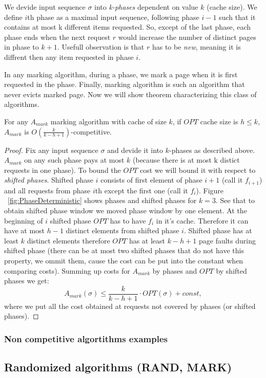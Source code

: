 We devide input sequence $\sigma$ into \textit{k-phases} dependent on value $k$ 
(cache size). We define $i$th phase as a maximal input sequence, following 
phase $i-1$ such that it contains at most k different items requested. So, 
except of the last phase, each phase ends when the next request $r$ would 
increase the number of distinct pages in phase to $k+1$. Usefull observation is 
that $r$ has to be \textit{new}, meaning it is diffrent then any item requested 
in phase $i$.


In any marking algorithm, during a phase, we mark a page when it is first 
requested in the phase. Finally, marking algorithm is such an algorithm that 
never evicts marked page. Now we will show theorem characterizing this class of 
algorithms.
\begin{theorem}
For any $A_{mark}$ marking algorithm with cache of size $k$, if $OPT$ cache 
size is $h \leq k$, $A_{mark}$ is $O(\frac{k}{k-h+1})$-competitive.
\end{theorem}
\begin{proof}
Fix any input sequence $\sigma$ and devide it into $k$-phases as described 
above. $A_{mark}$ on any such phase pays at most $k$ (because there is at most 
k distict requests in one phase). To bound the $OPT$ cost we will bound it with 
respect to \textit{shifted phases}. Shifted phase $i$ consists 
of first element of phase $i+1$ (call it $f_{i+1}$) and all requests from phase 
$i$th except the first one (call it $f_i$). Figure 
~\ref{fig:PhaseDeterministic} shows phases and shifted phases for $k=3$. See 
that to obtain shifted phase window we moved phase window by one element. At 
the beginning of $i$ shifted phase $OPT$ has to have $f_i$ in it's cache. 
Therefore it can have at most $h-1$ distinct elements from shifted phase $i$. 
Shifted phase has at least $k$ distinct elements therefore $OPT$ has at least 
$k-h+1$ page faults during shifted phase (there can be at most two shifted 
phases that do not have this property, we ommit them, cause the cost can be put 
into the constant when comparing costs).
Summing up costs for $A_{mark}$ by phases and $OPT$ by shifted phases we get:
$$ A_{mark}(\sigma) \leq \frac{k}{k-h+1} \cdot OPT(\sigma) + const,$$
where we put all the cost obtained at requests not covered by phases (or 
shifted phases).
\end{proof}



\subsubsection{Non competitive algortithms examples}

\subsection{Randomized algorithms (RAND, MARK)}